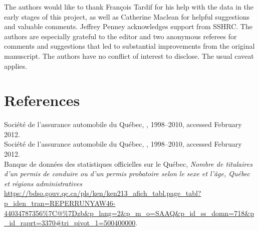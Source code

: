 \documentclass[11pt]{paper}
\begin{document}
The authors would like to thank 
Fran\c{c}ois Tardif for his help with the data in the early stages of this project, 
as well as  
Catherine Maclean 
for helpful suggestions and valuable comments. 
Jeffrey Penney acknowledges support from SSHRC. 
The authors are especially grateful to the editor and two anonymous referees 
for comments and suggestions that led to substantial improvements from the original manuscript. 
The authors have no conflict of interest to disclose. 
The usual caveat applies.



\section*{References}

\noindent Soci\'{e}t\'{e} de l'assurance automobile du Qu\'{e}bec,
, 
1998--2010, 
accessed February 2012. \\

\noindent Soci\'{e}t\'{e} de l'assurance automobile du Qu\'{e}bec,
, 
1998--2010, 
accessed February 2012. \\


\noindent Banque de donn\'{e}es des statistiques officielles sur le Qu\'{e}bec, 
\emph{Nombre de titulaires d'un permis de conduire ou d'un permis probatoire selon le sexe et l'\^{a}ge, Qu\'{e}bec et r\'{e}gions administratives}
\url{https://bdso.gouv.qc.ca/pls/ken/ken213_afich_tabl.page_tabl?p_iden_tran=REPERRUNYAW46-44034787356%7C@%7Dzb&p_lang=2&p_m_o=SAAQ&p_id_ss_domn=718&p_id_raprt=3370#tri_pivot_1=500400000}. 
\end{document}

